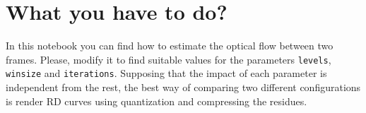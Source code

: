 \begin{comment}
The optical flow~\cite{horn1981determining} tries to establish connections between the pixels of
the frames $P$ and $R$ supposing that:
\begin{enumerate}
\item $P$ and $R$ are adjacent in time (if $R$ was taken at time $t$,
  $P$ is taken at time $dt+t$) and therefore, similar in
  content.
\item Similarity between images implies that the pixels in both
  frames, $R$ and $P$, will have the same luminance. If $I(x,y,t)$
  measures the luminance of the pixel $(x,y)$ of the frame $R$,
  similarity can be modeled by
  \begin{equation}
    I(x+dx, y+dy, t+dt) = I(x,y,t),
    \label{eq:similarity}
  \end{equation}
  where $I(x+dx, y+dy, t+dt)$ is the corresponding pixel in the frame
  $P$. The first part of the Eq.~\ref{eq:similarity} can be also
  computed by (using the first-order Taylor expansion) as
  \begin{equation}
    I(x+dx, y+dy, t+dt) = I(x,y,t) + \frac{\partial I}{\partial x}dx + \frac{\partial I}{\partial y}dy + \frac{\partial I}{\partial t}dt,
    \label{eq:taylor_exp}
  \end{equation}
  andtherefore, it must be true that
  \begin{equation}
    \frac{\partial I}{\partial x}dx + \frac{\partial I}{\partial y}dy + \frac{\partial I}{\partial t}dt = 0.
    \label{eq:constraint}
  \end{equation}
  Dividing by $dt$, we finally get that
  \begin{equation}
    \frac{\partial I}{\partial x}\frac{dx}{dt} + \frac{\partial I}{\partial y}\frac{dy}{dt} + \frac{\partial I}{\partial t} = 0.
  \end{equation}
\item Adjacent pixels follow parallel
  trajectories~\cite{horn1981determining}, with basically means that
  neighbor pixels will have similar motion.
\end{enumerate}
\end{comment}

\section{What you have to do?}

In this notebook you can find how to estimate the optical flow between
two frames. Please, modify it to find suitable values for the
parameters \texttt{levels}, \texttt{winsize} and
\texttt{iterations}. Supposing that the impact of each parameter is
independent from the rest, the best way of comparing two different
configurations is render RD curves using quantization and compressing
the residues.

